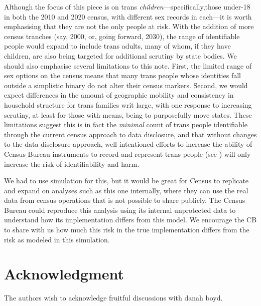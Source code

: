 \documentclass{jpc} %
\theoremstyle{plain}\newtheorem{satz}[thm]{Satz} %
\begin{document}
Although the focus of this piece is on trans \textit{children}---specifically,those under-18 in both the 2010 and 2020 census, with different sex records in each---it is worth emphasising that they are not the only people at risk. With the addition of more census tranches (say, 2000, or, going forward, 2030), the range of identifiable people would expand to include trans adults, many of whom, if they have children, are also being targeted for additional scrutiny by state bodies. We should also emphasise several limitations to this note. First, the limited range of sex options on the census means that many trans people whose identities fall outside a simplistic binary do not alter their census markers. Second, we would expect differences in the amount of geographic mobility and consistency in household structure for trans families writ large, with one response to increasing scrutiny, at least for those with means, being to purposefully move states. These limitations suggest this is in fact the \textit{minimal} count of trans people identifiable through the current census approach to data disclosure, and that without changes to the data disclosure approach, well-intentioned efforts to increase the ability of Census Bureau instruments to record and represent trans people (see \cite{whfactsheet}) will only increase the risk of identifiability and harm.

We had to use simulation for this, but it would be great for Census to replicate and expand on analyses such as this one internally, where they can use the real data from census operations that is not possible to share publicly.  The Census Bureau could reproduce this analysis using its internal unprotected data to understand how its implementation differs from this model. We encourage the CB to share with us how much this risk in the true implementation differs from the risk as modeled in this simulation.

 
\section*{Acknowledgment}
  \noindent The authors wish to acknowledge fruitful discussions with danah boyd.




\end{document}

